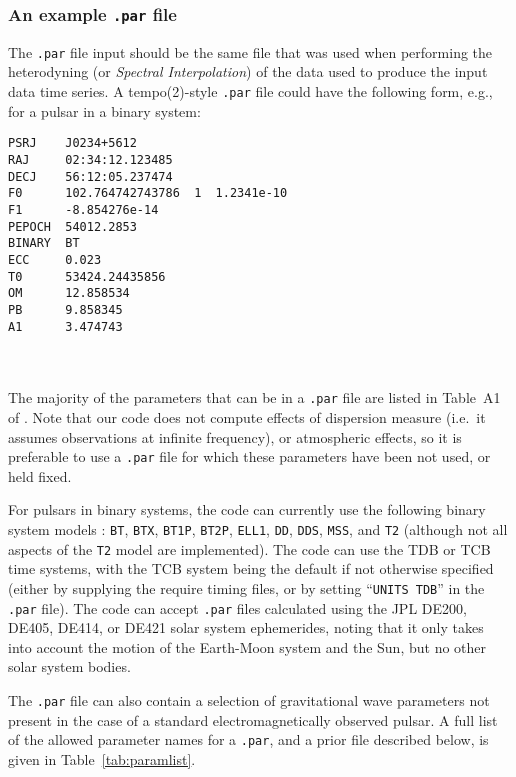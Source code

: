 \subsubsection{An example {\tt .par} file}\label{sec:parfile}

The {\tt .par} file input should be the same file that was used when performing the heterodyning (or {\it Spectral Interpolation})
of the data used to produce the input data time series. A {\sc tempo(2)}-style {\tt .par} file could have the following form, e.g.,
for a pulsar in a binary system:
\newsavebox{\Lst}
\begin{lrbox}{\Lst}
\begin{lstlisting}
PSRJ    J0234+5612
RAJ     02:34:12.123485
DECJ    56:12:05.237474
F0      102.764742743786  1  1.2341e-10
F1      -8.854276e-14
PEPOCH  54012.2853
BINARY  BT
ECC     0.023
T0      53424.24435856
OM      12.858534
PB      9.858345
A1      3.474743
\end{lstlisting}
\end{lrbox}
\\[5pt] \indent \fbox{\usebox{\Lst}} \\[5pt]

The majority of the parameters that can be in a {\tt .par} file are listed in Table~A1 of \citet{2006MNRAS.372.1549E}.
Note that our code does not compute effects of dispersion measure (i.e.\ it assumes observations at infinite frequency),
or atmospheric effects, so it is preferable to use a {\tt .par} file for which these parameters have been not
used, or held fixed.

For pulsars in binary systems, the code can currently use the following binary system models \citep[see, e.g.,][for discussion
of some of the models]{1989ApJ...345..434T,2007PhRvD..76d2006P}: {\tt BT}, {\tt BTX},
{\tt BT1P}, {\tt BT2P}, {\tt ELL1}, {\tt DD}, {\tt DDS}, {\tt MSS}, and {\tt T2} (although not all aspects of the
{\tt T2} model are implemented). The code can use the TDB or TCB time systems, with the TCB system being the default if not otherwise
specified (either by supplying the require timing files, or by setting ``{\tt UNITS TDB}'' in the {\tt .par} file).
The code can accept {\tt .par} files calculated using the JPL DE200, DE405, DE414, or DE421 solar system ephemerides, noting
that it only takes into account the motion of the Earth-Moon system and the Sun, but no other solar system bodies.

The {\tt .par} file can also contain a selection of gravitational wave parameters not present in the case of a standard
electromagnetically observed pulsar. A full list of the allowed parameter names for a {\tt .par}, and a prior file described below,
is given in Table~\ref{tab:paramlist}.

